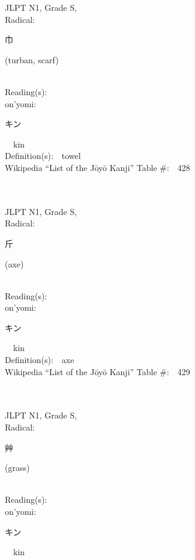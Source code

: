 \begin{multicols}{2}
{JLPT N1, Grade S, \\Radical:\ \ {\begin{CJK}{UTF8}{min} 巾 \end{CJK}} (turban, scarf) } \\
Reading(s):\ \ \\
{\hspace*{1em}}on'yomi:\ \ \\
{\hspace*{2em}}{\begin{CJK}{UTF8}{min} キン \end{CJK}}\ \ kin\ \ \\
Definition(s):\ \ towel \\
Wikipedia ``List of the J\=oy\=o Kanji'' Table \#:\ \ 428 \\
\ \ \\
{\fontsize{34pt}{40pt}  }\ \ \\
{JLPT N1, Grade S, \\Radical:\ \ {\begin{CJK}{UTF8}{min} 斤 \end{CJK}} (axe) } \\
Reading(s):\ \ \\
{\hspace*{1em}}on'yomi:\ \ \\
{\hspace*{2em}}{\begin{CJK}{UTF8}{min} キン \end{CJK}}\ \ kin\ \ \\
Definition(s):\ \ axe \\
Wikipedia ``List of the J\=oy\=o Kanji'' Table \#:\ \ 429 \\
\ \ \\
{\fontsize{34pt}{40pt}  }\ \ \\
{JLPT N1, Grade S, \\Radical:\ \ {\begin{CJK}{UTF8}{min} 艸 \end{CJK}} (grass) } \\
Reading(s):\ \ \\
{\hspace*{1em}}on'yomi:\ \ \\
{\hspace*{2em}}{\begin{CJK}{UTF8}{min} キン \end{CJK}}\ \ kin\ \ \\

\end{multicols}
